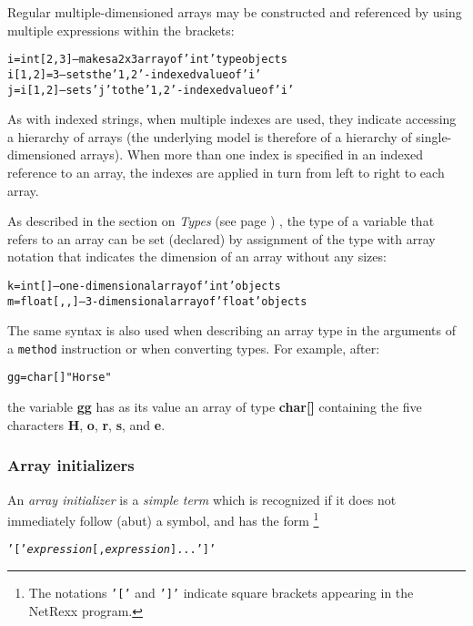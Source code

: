 Regular multiple-dimensioned arrays may be constructed and referenced by
using multiple expressions within the brackets:
\begin{alltt}
i=int[2,3] -- makes a 2x3 array of 'int' type objects
i[1,2]=3   -- sets the '1,2'-indexed value of 'i'
j=i[1,2]   -- sets 'j' to the '1,2'-indexed value of 'i'
\end{alltt}
 As with indexed strings, when multiple indexes are used, they
indicate accessing a hierarchy of arrays (the underlying model is
therefore of a hierarchy of single-dimensioned arrays).
When more than one index is specified in an indexed reference to an
array, the indexes are applied in turn from left to right to each
array.
 
As described in the section on  \emph{Types} (see page \pageref{reftypes}) , the
type of a variable that refers to an array can be set (declared) by
assignment of the type with array notation that indicates the dimension
of an array without any sizes:
\begin{alltt}
k=int[]     -- one-dimensional array of 'int' objects
m=float[,,] -- 3-dimensional array of 'float' objects
\end{alltt}

The same syntax is also used when describing an array type in the
arguments of a \texttt{method} instruction or when converting types.
For example, after:
\begin{alltt}
gg=char[] "Horse"
\end{alltt}
the variable \textbf{gg} has as its value an array of
type \textbf{char[]} containing the five
characters \textbf{H}, \textbf{o}, \textbf{r}, \textbf{s},
and \textbf{e}.
\subsubsection{Array initializers}\label{"id"}
 
An \emph{array initializer} is a \emph{simple term} which is
recognized if it does not immediately follow (abut) a symbol, and has
the form
\footnote{
The notations \texttt{'['} and \texttt{']'}
indicate square brackets appearing in the NetRexx program.
}
\begin{alltt}
\texttt{'['}\emph{expression}[,\emph{expression}]...\texttt{']'}
\end{alltt}
 
